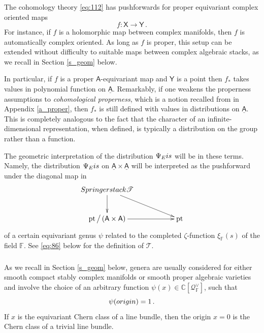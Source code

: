 \documentclass[14pt]{extarticle}
\newcommand{\C}{\mathbb{C}}
\newcommand{\F}{\mathbb{F}}
\newcommand{\bA}{\mathsf{A}}
\newcommand{\bY}{\mathsf{Y}}
\newcommand{\bB}{\mathsf{B}}
\newcommand{\bX}{\mathsf{X}}
\newcommand{\cT}{\mathscr{T}}
\newcommand{\cQ}{\mathscr{Q}}
\newcommand{\uA}{\underline{\bA}}
\DeclareMathOperator{\pt}{pt}
\newcommand{\Eis}{\textup{Eis}}
\theoremstyle{definition}
\begin{document}
\subsubsection{}
The cohomology theory \eqref{eq:112} has pushforwards for
proper equivariant complex oriented maps
\[
  f: \bX \to \bY \,.
\]
For instance, if $f$ is a holomorphic map between complex manifolds, then
$f$ is automatically complex oriented. As long as $f$ is proper,
this setup can be extended  without difficulty
to suitable maps between complex algebraic stacks,
as we recall in Section \ref{s_geom} below. 

In particular, if $f$ is a proper $\bA$-equivariant map and 
 $\bY$ is a point then $f_*$ takes values in
 polynomial function on $\uA$. Remarkably, if one weakens the
 properness assumptions to \emph{cohomological properness}, which is a
notion recalled from \cite{DHLloc} in
 Appendix \ref{a_proper}, then
 $f_*$ is still defined with values in distributions on $\uA$. This is
 completely analogous to the fact that the character of an
 infinite-dimensional representation, when defined, is typically a
 distribution on the group rather than a function.

 The geometric interpretation of the
 distribution $\Psi_\Eis$ will be in these terms. Namely, the
 distribution $\Psi_\Eis$ on $\uA \times \uA$ 
 will be interpreted as the
 pushforward under the diagonal map in 
 \begin{equation}
   \xymatrix{
     \textup{Springer stack } \cT \ar[rrd] \ar[d] \\
    \pt\big/\left(\bA \times \bA
 \right)\ar[rr] && \pt}\label{eq:82}
 \end{equation}
%
 of a certain equivariant genus $\psi$ related to the completed
 $\zeta$-function $\xi_\F(s)$ of the field $\F$. See \eqref{eq:86}
below  for the definition of $\cT$. 

 \subsubsection{} 

As we recall in Section \ref{s_geom} below, 
genera are usually considered for either smooth compact stably complex
manifolds or smooth proper algebraic varieties and involve the choice of an
arbitrary function $\psi(x)\in \C\left[\cQ_\F^\vee\right]$, such that
%
\begin{equation}
\psi( \textup{origin} ) =1 \,.\label{eq:113}
\end{equation}
%
If $x$ is the
equivariant Chern class of a line bundle, then the origin $x=0$ is the
Chern class of a trivial line bundle. 
\end{document}
